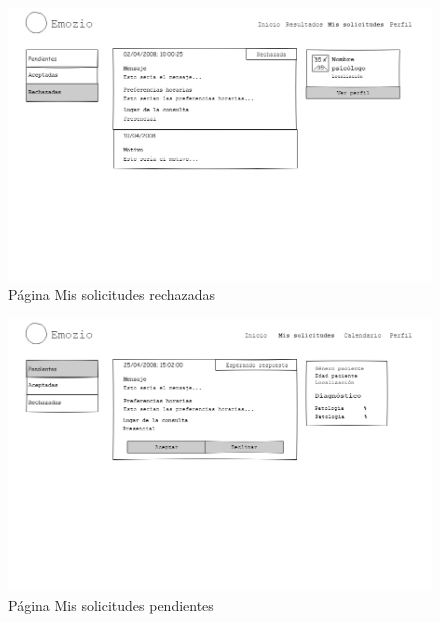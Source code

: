 \begin{figure}[htbp] 
    \centering
    \includegraphics[width=1\textwidth]{figuras/mockup_pacientes/mailrechazadas.png}
    \caption{Página Mis solicitudes rechazadas}
\end{figure}	

\begin{figure}[htbp] 
    \centering
    \includegraphics[width=1\textwidth]{figuras/mockup_psicologos/mailpendientes.png}
    \caption{Página Mis solicitudes pendientes}
\end{figure}	

